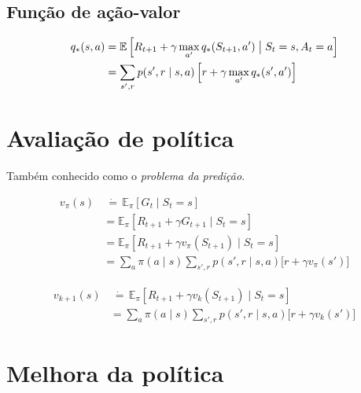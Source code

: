 \documentclass{article}
\begin{document}
    \subsection{Função de ação-valor}

        \begin{equation}
            \begin{split}
                q_*(s,a) & = \mathbb{E} \left[ R_{t+1} + \gamma \max_{a'} q_*(S_{t+1}, a') \bigm\vert S_t = s, A_t = a \right] \\
                & = \sum_{s', r} p(s',r \mid s,a) \left[ r + \gamma \max_{a'}q_*(s', a') \right]
            \end{split}
        \end{equation}
        
\section{Avaliação de política}

    Também conhecido como o \textit{problema da predição}.
    
    \begin{equation}
        \begin{split}
            v_{\pi}(s) & \ \dot{=} \, \mathbb{E}_{\pi} \left[ G_t \mid S_t = s \right] \\
            & = \mathbb{E}_{\pi} \left[ R_{t+1} + \gamma G_{t+1} \mid S_t = s \right] \\
            & = \mathbb{E}_{\pi} \left[ R_{t+1} + \gamma v_{\pi}(S_{t+1}) \mid S_t = s \right] \\
            & = \sum_a \pi(a \mid s) \sum_{s',r} p(s',r \mid s,a) \Big[ r + \gamma v_{\pi}(s') \Big]
        \end{split}
    \end{equation}
    
    \begin{equation}
        \begin{split}
            v_{k+1}(s) & \ \dot{=} \, \mathbb{E}_{\pi} \left[ R_{t+1} + \gamma v_k(S_{t+1}) \mid S_t = s \right] \\
            & = \sum_a \pi(a \mid s) \sum_{s',r} p(s',r \mid s,a) \Big[ r + \gamma v_k(s') \Big]
        \end{split}
    \end{equation}
    
\section{Melhora da política}
\end{document}
